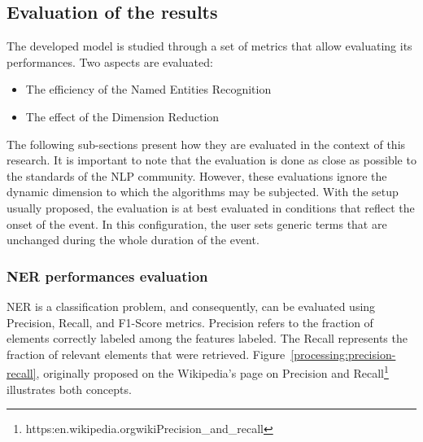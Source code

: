 \subsection{Evaluation of the results}
The developed model is studied through a set of metrics that allow evaluating its performances.
Two aspects are evaluated:

\begin{itemize}
    \item The efficiency of the Named Entities Recognition
    \item The effect of the Dimension Reduction
\end{itemize}

The following sub-sections present how they are evaluated in the context of this research.
It is important to note that the evaluation is done as close as possible to the standards of the NLP community.
However, these evaluations ignore the dynamic dimension to which the algorithms may be subjected.
With the setup usually proposed, the evaluation is at best evaluated in conditions that reflect the onset of the event.
In this configuration, the user sets generic terms that are unchanged during the whole duration of the event.

\subsubsection{NER performances evaluation}
NER is a classification problem, and consequently, can be evaluated using Precision, Recall, and F1-Score metrics.
Precision refers to the fraction of elements correctly labeled among the features labeled.
The Recall represents the fraction of relevant elements that were retrieved.
Figure~\ref{processing:precision-recall}, originally proposed on the Wikipedia's page on Precision and Recall\footnote{https:\/\/en.wikipedia.org\/wiki\/Precision\_and\_recall} illustrates both concepts.


